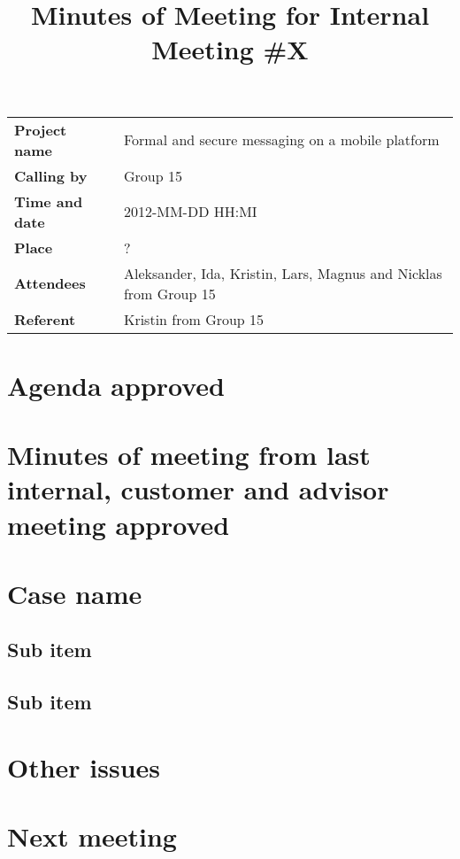 \documentclass[a4paper,12pt]{article}
\begin{document}
\title{Minutes of Meeting for Internal Meeting \#X}
\maketitle
\begin{tabular}{>{\bfseries}l l}	
Project name&Formal and secure messaging on a mobile platform\\
Calling by&Group 15\\
Time and date&2012-MM-DD HH:MI\\
Place&?\\
Attendees&Aleksander, Ida, Kristin, Lars, Magnus and Nicklas from Group 15\\
Referent&Kristin from Group 15\\
\end{tabular}

\section{Agenda approved}
\section{Minutes of meeting from last internal, customer and advisor meeting approved}
\section{Case name}
\subsection{Sub item}
\subsection{Sub item}
\section{Other issues}
\section{Next meeting}
\end{document}
